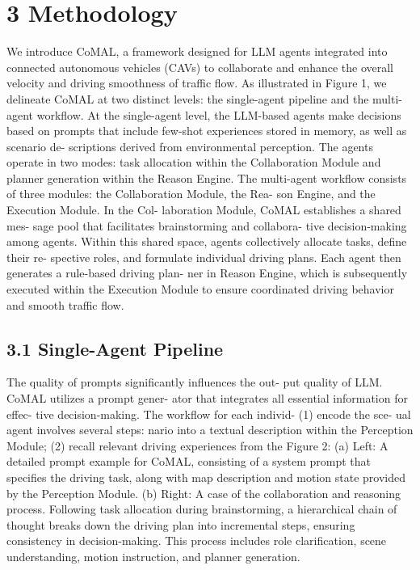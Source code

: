 \documentclass[12pt]{article}
\begin{document}
\section{3 Methodology}

We introduce CoMAL, a framework designed for LLM
agents integrated into connected autonomous vehicles
(CAVs) to collaborate and enhance the overall velocity
and driving smoothness of traffic flow. As illustrated
in Figure 1, we delineate CoMAL at two distinct levels:
the single-agent pipeline and the multi-agent workflow.
At the single-agent level, the LLM-based agents
make decisions based on prompts that include few-shot
experiences stored in memory, as well as scenario de-
scriptions derived from environmental perception. The
agents operate in two modes: task allocation within the
Collaboration Module and planner generation within
the Reason Engine. The multi-agent workflow consists
of three modules: the Collaboration Module, the Rea-
son Engine, and the Execution Module.
In the Col-
laboration Module, CoMAL establishes a shared mes-
sage pool that facilitates brainstorming and collabora-
tive decision-making among agents. Within this shared
space, agents collectively allocate tasks, define their re-
spective roles, and formulate individual driving plans.
Each agent then generates a rule-based driving plan-
ner in Reason Engine, which is subsequently executed
within the Execution Module to ensure coordinated
driving behavior and smooth traffic flow.
\subsection{3.1 Single-Agent Pipeline}

The quality of prompts significantly influences the out-
put quality of LLM. CoMAL utilizes a prompt gener-
ator that integrates all essential information for effec-
tive decision-making. The workflow for each individ-
(1) encode the sce-
ual agent involves several steps:
nario into a textual description within the Perception
Module; (2) recall relevant driving experiences from the
Figure 2: (a) Left: A detailed prompt example for CoMAL, consisting of a system prompt that specifies the
driving task, along with map description and motion state provided by the Perception Module. (b) Right: A case
of the collaboration and reasoning process. Following task allocation during brainstorming, a hierarchical chain
of thought breaks down the driving plan into incremental steps, ensuring consistency in decision-making. This
process includes role clarification, scene understanding, motion instruction, and planner generation.
\end{document}
